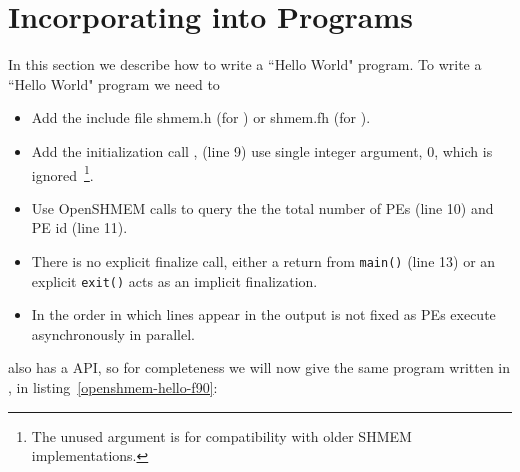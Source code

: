 \section*{Incorporating \openshmem{} into Programs}

In this section we describe how to write a ``Hello World" \openshmem program.
To write a ``Hello World" \openshmem program we need to 

\begin{itemize}
\item Add the include file shmem.h (for \Clang) or shmem.fh (for \Fortran).
\item Add the initialization call , (line 9) use
  single integer argument, 0, which is ignored~\footnote{The unused
    argument is for compatibility with older SHMEM implementations.}.
\item Use OpenSHMEM calls to query the the total number of PEs (line 10) and PE id (line 11).
\item There is no explicit finalize call, either a return from
  \texttt{main()} (line 13) or an explicit \texttt{exit()} acts as an
  implicit \openshmem finalization.
\item In \openshmem the order in which lines appear
  in the output is not fixed as \ac{PE}s execute asynchronously in parallel.
\end{itemize}

\begin{minipage}{\linewidth}
\vspace{0.1in}
\vspace{0.1in}
\end{minipage}

\openshmem also has a \Fortran{} API, so for completeness we will now give the
same program written in \Fortran, in listing~\ref{openshmem-hello-f90}:

\begin{minipage}{\linewidth}
\vspace{0.1in}
\vspace{0.1in}
\end{minipage}

